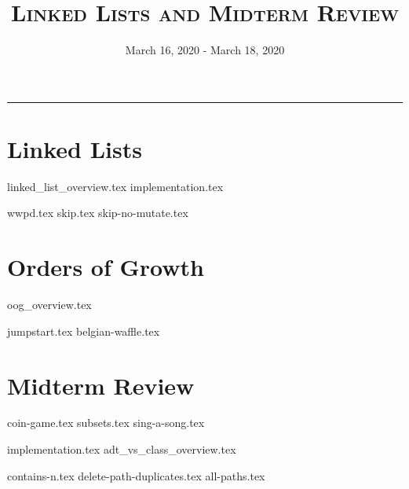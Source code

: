 \documentclass{exam}
\title{\textsc{Linked Lists and Midterm Review}}
\date{March 16, 2020 - March 18, 2020}
\begin{document}
\maketitle
\rule{\textwidth}{0.15em}
\fontsize{12}{15}\selectfont

\section{Linked Lists}
{linked_list_overview.tex}
{implementation.tex}
\newpage
\begin{questions}
{wwpd.tex}
\newpage
{skip.tex}
{skip-no-mutate.tex}
\end{questions}
\newpage

\section{Orders of Growth}
{oog_overview.tex}
\begin{questions}
{jumpstart.tex}
{belgian-waffle.tex}
\end{questions}

\section{Midterm Review}
\begin{questions}
{coin-game.tex}
{subsets.tex}
{sing-a-song.tex}
\end{questions}
\newpage
{implementation.tex}
{adt_vs_class_overview.tex}
\vspace{\baselineskip}
\begin{questions}
{contains-n.tex}
{delete-path-duplicates.tex}
\newpage
{all-paths.tex}

\end{questions}
\end{document}
